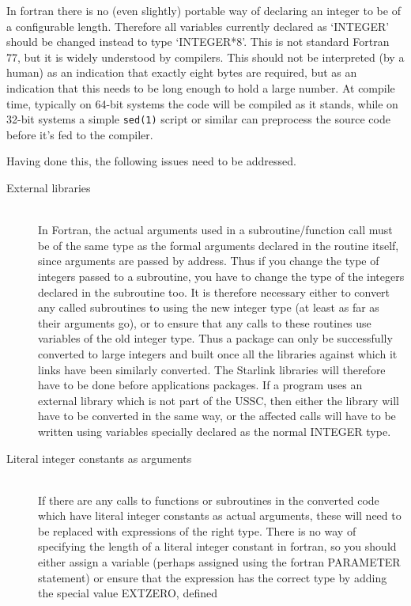 \documentclass[twoside,11pt]{article}
\renewcommand{\_}{\texttt{\symbol{95}}}
\begin{document}
In fortran there is no (even slightly) portable way of declaring
an integer to be of a configurable length. 
Therefore all variables currently declared as `INTEGER' 
should be changed instead to type `INTEGER*8'. 
This is not standard Fortran 77, but it is widely understood by compilers.
This should not be interpreted (by a human) as an indication that exactly
eight bytes are required, but as an indication that this needs to be
long enough to hold a large number.
At compile time, typically on 64-bit systems the code will be compiled
as it stands, while on 32-bit systems a simple {\tt sed(1)} script or similar
can preprocess the source code before it's fed to the compiler.

Having done this, the following issues need to be addressed.
\begin{description}
%
\item[External libraries]\mbox{}
\\
In Fortran, the actual arguments used in a subroutine/function
call must be of the same type as the formal arguments declared
in the routine itself, since arguments are passed by address.
Thus if you change the type of integers passed to a subroutine,
you have to change the type of the integers declared in the subroutine too.
It is therefore necessary either to convert any called subroutines
to using the new integer type (at least as far as their arguments go), 
or to ensure that any calls to these routines use variables of 
the old integer type.
Thus a package can only be successfully converted to large integers
and built once all the libraries against which it links have been 
similarly converted.  The Starlink libraries will therefore have to
be done before applications packages.
If a program uses an external library which is not part of the USSC,
then either the library will have to be converted in the same way,
or the affected calls will have to be written using 
variables specially declared as the normal INTEGER type.
%
\item[Literal integer constants as arguments]\mbox{}
\\
If there are any calls to functions or subroutines in the converted 
code which have literal integer constants as actual arguments,
these will need to be replaced with expressions of the right type.
There is no way of specifying the length of a literal integer constant
in fortran, so you should either assign a variable (perhaps assigned
using the fortran PARAMETER statement) or ensure that the expression
has the correct type by adding the special value EXT\_\_ZERO, defined

\end{description}
\end{document}
